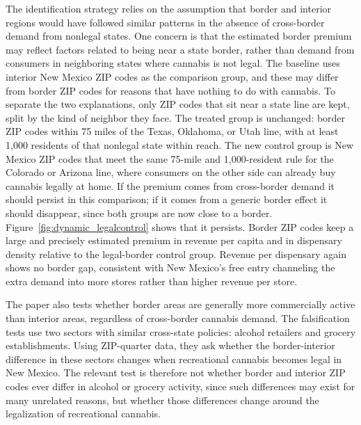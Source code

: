 \documentclass[english,12pt]{article}
\begin{document}
The identification strategy relies on the assumption that border and interior regions would have followed similar patterns in the absence of cross-border demand from nonlegal states. One concern is that the estimated border premium may reflect factors related to being near a state border, rather than demand from consumers in neighboring states where cannabis is not legal.
 The baseline uses interior New Mexico ZIP codes as the comparison group, and these may differ from border ZIP codes for reasons that have nothing to do with cannabis. To separate the two explanations, only ZIP codes that sit near a state line are kept, split by the kind of neighbor they face. The treated group is unchanged: border ZIP codes within 75 miles of the Texas, Oklahoma, or Utah line, with at least 1{,}000 residents of that nonlegal state within reach. The new control group is New Mexico ZIP codes that meet the same 75-mile and 1{,}000-resident rule for the Colorado or Arizona line, where consumers on the other side can already buy cannabis legally at home. If the premium comes from cross-border demand it should persist in this comparison; if it comes from a generic border effect it should disappear, since both groups are now close to a border. Figure~\ref{fig:dynamic_legalcontrol} shows that it persists. Border ZIP codes keep a large and precisely estimated premium in revenue per capita and in dispensary density relative to the legal-border control group. Revenue per dispensary again shows no border gap, consistent with New Mexico's free entry channeling the extra demand into more stores rather than higher revenue per store.

The paper also tests whether border areas are generally more commercially active than interior areas, regardless of cross-border cannabis demand.
 The falsification tests use two sectors with similar cross-state policies: alcohol retailers and grocery establishments. Using ZIP-quarter data, they ask whether the border-interior difference in these sectors changes when recreational cannabis becomes legal in New Mexico. The relevant test is therefore not whether border and interior ZIP codes ever differ in alcohol or grocery activity, since such differences may exist for many unrelated reasons, but whether those differences change around the legalization of recreational cannabis.
\end{document}
